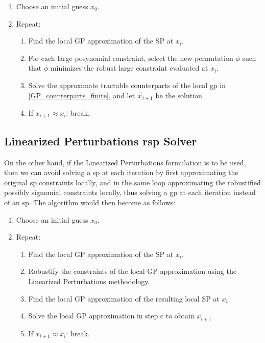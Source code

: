 \begin{enumerate}
    \item Choose an initial guess $x_0$.
    \item Repeat:
    \begin{enumerate}
        \item Find the local GP approximation of the SP at $x_i$.
        \item For each large posynomial constraint, select the new permutation $\phi$
                such that $\phi$ minimizes the robust large constraint evaluated at $x_i$.
        \item Solve the approximate tractable counterparts of the local \gls{gp} in
                \eqref{GP_counterparts_finite}, and let $\vec{x}_{i+1}$ be the solution.
        \item If $x_{i+1} \approx x_{i}$: break.
    \end{enumerate}
\end{enumerate}

\subsection{Linearized Perturbations \gls{rsp} Solver}

On the other hand, if the Linearized Perturbations formulation is to be used,
then we can avoid solving a \gls{sp} at each iteration by first
approximating the original \gls{sp} constraints locally, and in the same loop approximating
the robustified possibly signomial constraints locally, thus solving a
\gls{gp} at each iteration instead of an \gls{sp}. The algorithm would then become as follows:

\begin{enumerate}
    \item Choose an initial guess $x_0$.
    \item Repeat:
    \begin{enumerate}
        \item Find the local GP approximation of the SP at $x_i$.
        \item Robustify the constraints of the local GP approximation using the Linearized Perturbations methodology.
        \item Find the local GP approximation of the resulting local SP at $x_i$.
        \item Solve the local GP approximation in step c to obtain $x_{i+1}$
        \item If $x_{i+1} \approx x_{i}$: break.
    \end{enumerate}
\end{enumerate}
